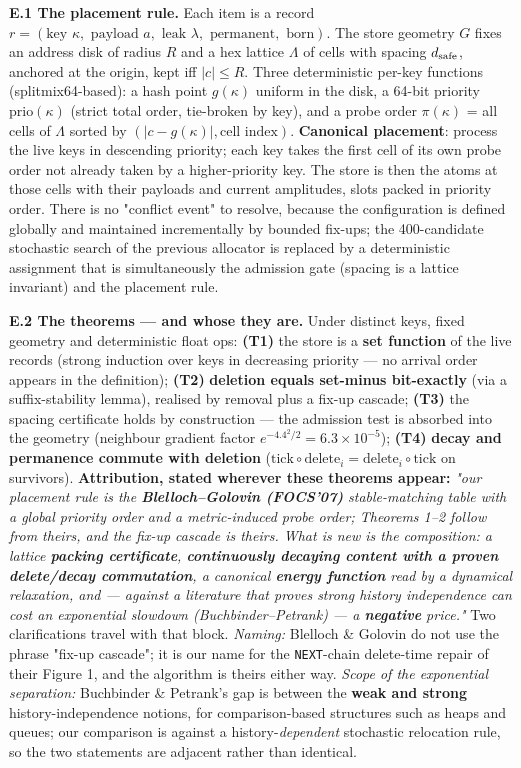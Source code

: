 \documentclass{article}
\begin{document}
\textbf{E.1 The placement rule.} Each item is a record $r=(\text{key }\kappa,\text{ payload }a,\text{ leak }\lambda,\text{ permanent},\text{ born})$. The store geometry $G$ fixes an address disk of radius $R$ and a hex lattice $\Lambda$ of cells with spacing $d_{\rm safe}$, anchored at the origin, kept iff $|c|\le R$. Three deterministic per-key functions (splitmix64-based): a hash point $g(\kappa)$ uniform in the disk, a 64-bit priority $\mathrm{prio}(\kappa)$ (strict total order, tie-broken by key), and a probe order $\pi(\kappa)$ = all cells of $\Lambda$ sorted by $(|c-g(\kappa)|,\text{cell index})$. \textbf{Canonical placement}: process the live keys in descending priority; each key takes the first cell of its own probe order not already taken by a higher-priority key. The store is then the atoms at those cells with their payloads and current amplitudes, slots packed in priority order. There is no "conflict event" to resolve, because the configuration is defined globally and maintained incrementally by bounded fix-ups; the 400-candidate stochastic search of the previous allocator is replaced by a deterministic assignment that is simultaneously the admission gate (spacing is a lattice invariant) and the placement rule.

\textbf{E.2 The theorems --- and whose they are.} Under distinct keys, fixed geometry and deterministic float ops: \textbf{(T1)} the store is a \textbf{set function} of the live records (strong induction over keys in decreasing priority --- no arrival order appears in the definition); \textbf{(T2)} \textbf{deletion equals set-minus bit-exactly} (via a suffix-stability lemma), realised by removal plus a fix-up cascade; \textbf{(T3)} the spacing certificate holds by construction --- the admission test is absorbed into the geometry (neighbour gradient factor $e^{-4.4^2/2}=6.3\times10^{-5}$); \textbf{(T4)} \textbf{decay and permanence commute with deletion} ($\text{tick}\circ\text{delete}_i=\text{delete}_i\circ\text{tick}$ on survivors). \textbf{Attribution, stated wherever these theorems appear:} \emph{"our placement rule is the \textbf{Blelloch--Golovin (FOCS'07)} stable-matching table with a global priority order and a metric-induced probe order; Theorems 1--2 follow from theirs, and the fix-up cascade is theirs. What is new is the composition: a lattice \textbf{packing certificate}, \textbf{continuously decaying content with a proven delete/decay commutation}, a canonical \textbf{energy function} read by a dynamical relaxation, and --- against a literature that proves strong history independence can cost an exponential slowdown (Buchbinder--Petrank) --- a \textbf{negative} price."} Two clarifications travel with that block. \emph{Naming:} Blelloch \& Golovin do not use the phrase "fix-up cascade"; it is our name for the \texttt{NEXT}-chain delete-time repair of their Figure 1, and the algorithm is theirs either way. \emph{Scope of the exponential separation:} Buchbinder \& Petrank's gap is between the \textbf{weak and strong} history-independence notions, for comparison-based structures such as heaps and queues; our comparison is against a history-\emph{dependent} stochastic relocation rule, so the two statements are adjacent rather than identical.
\end{document}
